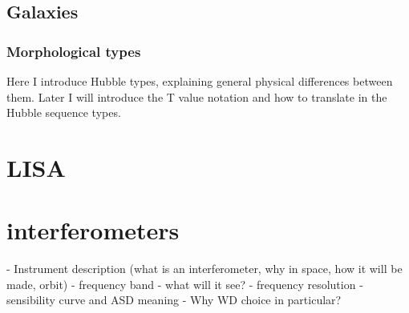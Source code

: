 \subsection{Galaxies}
\subsubsection{Morphological types}
Here I introduce Hubble types, explaining general physical differences  between them.
Later I will introduce the T value notation and how to translate in the Hubble sequence types. 

\section{LISA}
\section{interferometers}



- Instrument description (what is an interferometer, why in space, how it will be made, orbit)
- frequency band - what will it see?
- frequency resolution
- sensibility curve and ASD meaning
- Why WD choice in particular?

